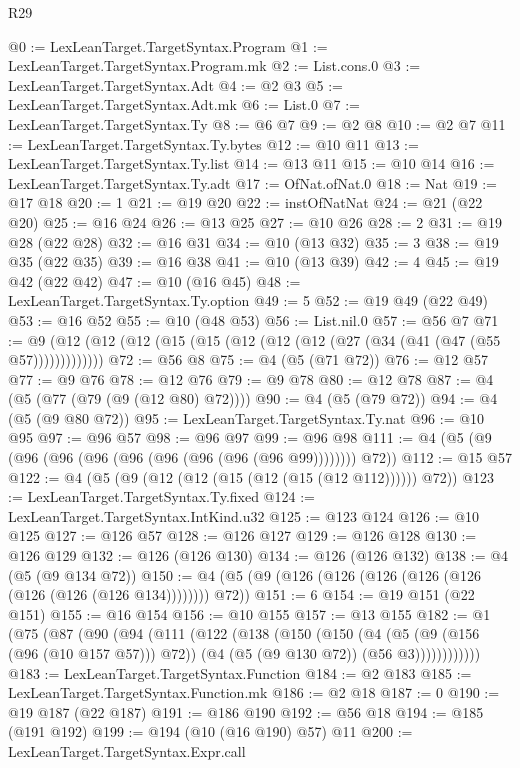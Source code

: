 \begin{lexlean}{R29}
\begin{coremodule}
@0 := LexLeanTarget.TargetSyntax.Program
@1 := LexLeanTarget.TargetSyntax.Program.mk
@2 := List.cons.{0}
@3 := LexLeanTarget.TargetSyntax.Adt
@4 := @2 @3
@5 := LexLeanTarget.TargetSyntax.Adt.mk
@6 := List.{0}
@7 := LexLeanTarget.TargetSyntax.Ty
@8 := @6 @7
@9 := @2 @8
@10 := @2 @7
@11 := LexLeanTarget.TargetSyntax.Ty.bytes
@12 := @10 @11
@13 := LexLeanTarget.TargetSyntax.Ty.list
@14 := @13 @11
@15 := @10 @14
@16 := LexLeanTarget.TargetSyntax.Ty.adt
@17 := OfNat.ofNat.{0}
@18 := Nat
@19 := @17 @18
@20 := 1
@21 := @19 @20
@22 := instOfNatNat
@24 := @21 (@22 @20)
@25 := @16 @24
@26 := @13 @25
@27 := @10 @26
@28 := 2
@31 := @19 @28 (@22 @28)
@32 := @16 @31
@34 := @10 (@13 @32)
@35 := 3
@38 := @19 @35 (@22 @35)
@39 := @16 @38
@41 := @10 (@13 @39)
@42 := 4
@45 := @19 @42 (@22 @42)
@47 := @10 (@16 @45)
@48 := LexLeanTarget.TargetSyntax.Ty.option
@49 := 5
@52 := @19 @49 (@22 @49)
@53 := @16 @52
@55 := @10 (@48 @53)
@56 := List.nil.{0}
@57 := @56 @7
@71 := @9 (@12 (@12 (@12 (@15 (@15 (@12 (@12 (@12 (@27 (@34 (@41 (@47 (@55 @57)))))))))))))
@72 := @56 @8
@75 := @4 (@5 (@71 @72))
@76 := @12 @57
@77 := @9 @76
@78 := @12 @76
@79 := @9 @78
@80 := @12 @78
@87 := @4 (@5 (@77 (@79 (@9 (@12 @80) @72))))
@90 := @4 (@5 (@79 @72))
@94 := @4 (@5 (@9 @80 @72))
@95 := LexLeanTarget.TargetSyntax.Ty.nat
@96 := @10 @95
@97 := @96 @57
@98 := @96 @97
@99 := @96 @98
@111 := @4 (@5 (@9 (@96 (@96 (@96 (@96 (@96 (@96 (@96 (@96 @99)))))))) @72))
@112 := @15 @57
@122 := @4 (@5 (@9 (@12 (@12 (@15 (@12 (@15 (@12 @112)))))) @72))
@123 := LexLeanTarget.TargetSyntax.Ty.fixed
@124 := LexLeanTarget.TargetSyntax.IntKind.u32
@125 := @123 @124
@126 := @10 @125
@127 := @126 @57
@128 := @126 @127
@129 := @126 @128
@130 := @126 @129
@132 := @126 (@126 @130)
@134 := @126 (@126 @132)
@138 := @4 (@5 (@9 @134 @72))
@150 := @4 (@5 (@9 (@126 (@126 (@126 (@126 (@126 (@126 (@126 (@126 @134)))))))) @72))
@151 := 6
@154 := @19 @151 (@22 @151)
@155 := @16 @154
@156 := @10 @155
@157 := @13 @155
@182 := @1
    (@75
      (@87
        (@90
          (@94
            (@111
              (@122
                (@138
                  (@150
                    (@150
                      (@4
                        (@5 (@9 (@156 (@96 (@10 @157 @57))) @72))
                        (@4 (@5 (@9 @130 @72)) (@56 @3))))))))))))
@183 := LexLeanTarget.TargetSyntax.Function
@184 := @2 @183
@185 := LexLeanTarget.TargetSyntax.Function.mk
@186 := @2 @18
@187 := 0
@190 := @19 @187 (@22 @187)
@191 := @186 @190
@192 := @56 @18
@194 := @185 (@191 @192)
@199 := @194 (@10 (@16 @190) @57) @11
@200 := LexLeanTarget.TargetSyntax.Expr.call

\end{coremodule}
\end{lexlean}
